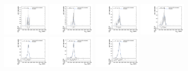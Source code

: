 \begin{figure}[htpb]
  \centering
  \includegraphics[width=0.2\textwidth]{fig/2Dfit/templateVsReco_VBFZprToWW2000_r0_MVV_mu_HP_bb_LDy_linear.pdf}
  \includegraphics[width=0.2\textwidth]{fig/2Dfit/templateVsReco_VBFZprToWW2000_r0_MVV_mu_LP_bb_LDy_linear.pdf}
  \includegraphics[width=0.2\textwidth]{fig/2Dfit/templateVsReco_VBFZprToWW2000_r0_MVV_mu_HP_bb_HDy_linear.pdf}
  \includegraphics[width=0.2\textwidth]{fig/2Dfit/templateVsReco_VBFZprToWW2000_r0_MVV_mu_LP_bb_HDy_linear.pdf}\\
  \includegraphics[width=0.2\textwidth]{fig/2Dfit/templateVsReco_VBFZprToWW2000_r0_MVV_mu_HP_nobb_LDy_linear.pdf}
  \includegraphics[width=0.2\textwidth]{fig/2Dfit/templateVsReco_VBFZprToWW2000_r0_MVV_mu_LP_nobb_LDy_linear.pdf}
  \includegraphics[width=0.2\textwidth]{fig/2Dfit/templateVsReco_VBFZprToWW2000_r0_MVV_mu_HP_nobb_HDy_linear.pdf}

\end{figure}
